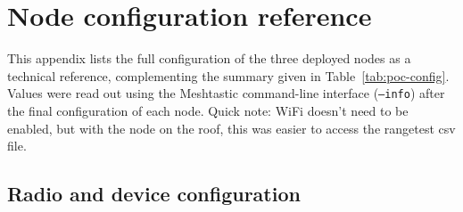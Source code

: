 \chapter{Node configuration reference}%
\label{ch:bijlage-config}

This appendix lists the full configuration of the three deployed nodes as a technical
reference, complementing the summary given in Table~\ref{tab:poc-config}. Values were
read out using the Meshtastic command-line interface (\texttt{--info}) after the final
configuration of each node.
Quick note: WiFi doesn't need to be enabled, but with the node on the roof, this was easier to access the rangetest csv file.

\section{Radio and device configuration}%
\label{sec:bijlage-config-device}

